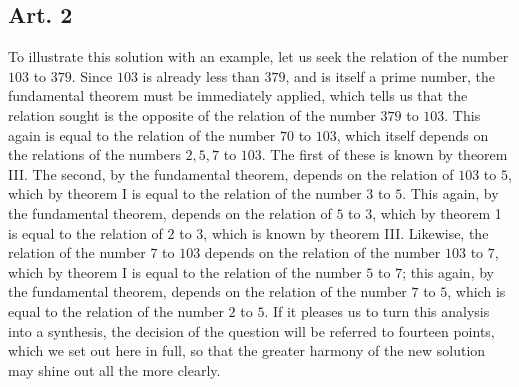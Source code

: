 \documentclass{book}
\theoremstyle{plain}
\theoremstyle{remark}
\begin{document}
\subsection*{Art. 2}

To illustrate this solution with an example, let us seek the relation of the number $103$ to $379$.  Since $103$ is already less than $379$, and is itself a prime number, the fundamental theorem must be immediately applied, which tells us that the relation sought is the opposite of the relation of the number $379$ to $103$.  This again is equal to the relation of the number $70$ to $103$, which itself depends on the relations of the numbers $2, 5, 7$ to $103$.  The first of these is known by theorem III.  The second, by the fundamental theorem, depends on the relation of $103$ to $5$, which by theorem I is equal to the relation of the number $3$ to $5$.  This again, by the fundamental theorem, depends on the relation of $5$ to $3$, which by theorem 1 is equal to the relation of $2$ to $3$, which is known by theorem III.  Likewise, the relation of the number $7$ to $103$ depends on the relation of the number $103$ to $7$, which by theorem I is equal to the relation of the number $5$ to $7$; this again, by the fundamental theorem, depends on the relation of the number $7$ to $5$, which is equal to the relation of the number $2$ to $5$.  If it pleases us to turn this analysis into a synthesis, the decision of the question will be referred to fourteen points, which we set out here in full, so that the greater harmony of the new solution may shine out all the more clearly. 
\end{document}
